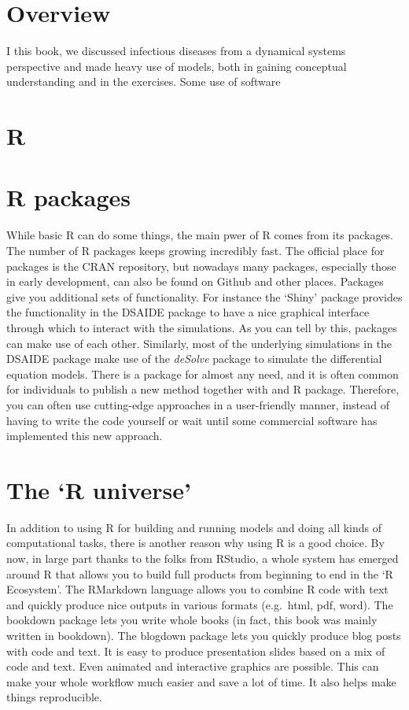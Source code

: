 \documentclass[]{book}
\theoremstyle{definition}
\theoremstyle{definition}
\theoremstyle{definition}
\theoremstyle{remark}
\begin{document}
\section{Overview}\label{overview}

I this book, we discussed infectious diseases from a dynamical systems
perspective and made heavy use of models, both in gaining conceptual
understanding and in the exercises. Some use of software

\section{R}\label{r}

\section{R packages}\label{r-packages}

While basic R can do some things, the main pwer of R comes from its
packages. The number of R packages keeps growing incredibly fast. The
official place for packages is the CRAN repository, but nowadays many
packages, especially those in early development, can also be found on
Github and other places. Packages give you additional sets of
functionality. For instance the `Shiny' package provides the
functionality in the DSAIDE package to have a nice graphical interface
through which to interact with the simulations. As you can tell by this,
packages can make use of each other. Similarly, most of the underlying
simulations in the DSAIDE package make use of the \emph{deSolve} package
to simulate the differential equation models. There is a package for
almost any need, and it is often common for individuals to publish a new
method together with and R package. Therefore, you can often use
cutting-edge approaches in a user-friendly manner, instead of having to
write the code yourself or wait until some commercial software has
implemented this new approach.

\section{\texorpdfstring{The `R
universe'}{The R universe}}\label{the-r-universe}

In addition to using R for building and running models and doing all
kinds of computational tasks, there is another reason why using R is a
good choice. By now, in large part thanks to the folks from RStudio, a
whole system has emerged around R that allows you to build full products
from beginning to end in the `R Ecosystem'. The RMarkdown language
allows you to combine R code with text and quickly produce nice outputs
in various formats (e.g.~html, pdf, word). The bookdown package lets you
write whole books (in fact, this book was mainly written in bookdown).
The blogdown package lets you quickly produce blog posts with code and
text. It is easy to produce presentation slides based on a mix of code
and text. Even animated and interactive graphics are possible. This can
make your whole workflow much easier and save a lot of time. It also
helps make things reproducible.
\end{document}
